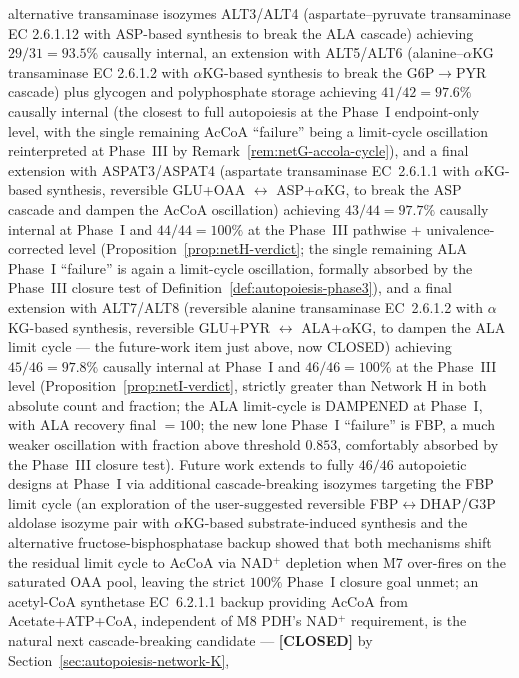 \documentclass[11pt,a4paper]{article}
\theoremstyle{plain}
\theoremstyle{definition}
\theoremstyle{remark}
\begin{document}
\begin{enumerate}[leftmargin=*,itemsep=2pt]
alternative transaminase isozymes ALT3/ALT4 (aspartate--pyruvate
transaminase EC 2.6.1.12 with ASP-based synthesis to break the ALA
cascade) achieving $29/31 = 93.5\%$ causally internal, an extension
with ALT5/ALT6 (alanine--$\alpha$KG transaminase EC 2.6.1.2
with $\alpha$KG-based synthesis to break the G6P$\to$PYR cascade) plus
glycogen and polyphosphate storage achieving $41/42 = 97.6\%$ causally
internal (the closest to full autopoiesis at the Phase~I
endpoint-only level, with the single remaining AcCoA ``failure'' being
a limit-cycle oscillation reinterpreted at Phase~III by
Remark~\ref{rem:netG-accola-cycle}), and a final extension with
ASPAT3/ASPAT4 (aspartate transaminase EC~2.6.1.1 with $\alpha$KG-based
synthesis, reversible GLU+OAA $\leftrightarrow$ ASP+$\alpha$KG, to
break the ASP cascade and dampen the AcCoA oscillation) achieving
$43/44 = 97.7\%$ causally internal at Phase~I and $44/44 = 100\%$ at
the Phase~III pathwise + univalence-corrected level
(Proposition~\ref{prop:netH-verdict}; the single remaining ALA Phase~I
``failure'' is again a limit-cycle oscillation, formally absorbed by
the Phase~III closure test of Definition~\ref{def:autopoiesis-phase3}),
and a final extension with ALT7/ALT8 (reversible alanine transaminase
EC~2.6.1.2 with $\alpha$KG-based synthesis, reversible
GLU+PYR $\leftrightarrow$ ALA+$\alpha$KG, to dampen the ALA limit
cycle --- the future-work item just above, now CLOSED) achieving
$45/46 = 97.8\%$ causally internal at Phase~I and $46/46 = 100\%$ at
the Phase~III level (Proposition~\ref{prop:netI-verdict}, strictly
greater than Network H in both absolute count and fraction; the ALA
limit-cycle is DAMPENED at Phase~I, with ALA recovery final $= 100$;
the new lone Phase~I ``failure'' is FBP, a much weaker oscillation
with fraction above threshold $0.853$, comfortably absorbed by the
Phase~III closure test).
Future work extends to fully $46/46$ autopoietic designs at Phase~I
via additional cascade-breaking isozymes targeting the FBP limit cycle
(an exploration of the user-suggested reversible FBP$\leftrightarrow$DHAP/G3P
aldolase isozyme pair with $\alpha$KG-based substrate-induced synthesis
and the alternative fructose-bisphosphatase backup showed that both
mechanisms shift the residual limit cycle to AcCoA via NAD$^+$ depletion
when M7 over-fires on the saturated OAA pool, leaving the strict
$100\%$ Phase~I closure goal unmet; an acetyl-CoA synthetase
EC~6.2.1.1 backup providing AcCoA from Acetate+ATP+CoA, independent of
M8 PDH's NAD$^+$ requirement, is the natural next cascade-breaking
candidate --- \textbf{[CLOSED]} by Section~\ref{sec:autopoiesis-network-K},

\end{enumerate}
\end{document}
